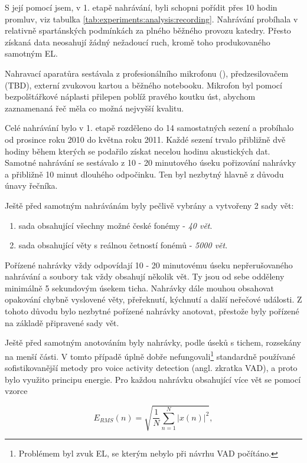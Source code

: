 S její pomocí jsem, v 1. etapě nahrávání, byli schopni pořídit přes 10 hodin promluv, viz tabulka \ref{tab:experiments:analysis:recording}. Nahrávání probíhala v relativně spartánských podmínkách za plného běžného provozu katedry. Přesto získaná data neosahují žádný nežadoucí ruch, kromě toho produkovaného samotným EL.

Nahravací aparatůra sestávala z profesionálního mikrofonu (), předzesilovačem (TBD), externí zvukovou kartou a běžného notebooku. Mikrofon byl pomocí bezpolštářkové náplasti přilepen poblíž pravého koutku úst, abychom zaznamenaná řeč měla co možná nejvyšší kvalitu.

Celé nahrávání bylo v 1. etapě rozděleno do 14 samostatných sezení a probíhalo od prosince roku 2010 do května roku 2011. Každé sezení trvalo přibližně dvě hodiny během kterých se podařilo získat necelou hodinu akustických dat. Samotné nahrávání se sestávalo z 10 - 20 minutového úseku pořizování nahrávky a přibližně 10 minut dlouhého odpočinku. Ten byl nezbytný hlavně z důvodu únavy řečníka.

Ještě před samotným nahrávánám byly pečlivě vybrány a vytvořeny 2 sady vět:

\begin{enumerate}
  \item sada obsahující všechny možné české fonémy - \textit{40 vět}.
  \item sada obsahující věty s reálnou četností fonémů - \textit{5000 vět}.
\end{enumerate}

\noindent Pořízené nahrávky vždy odpovídají 10 - 20 minutovému úseku nepřerušovaného nahrávání a soubory tak vždy obsahují několik vět. Ty jsou od sebe odděleny minimálně 5 sekundovým úsekem ticha. Nahrávky dále mouhou obsahovat opakování chybně vyslovené věty, přeřeknutí, kýchnutí a další neřečové události. Z tohoto důvodu bylo nezbytné pořízené nahrávky anotovat, přestože byly pořízené na základě připravené sady vět.

Ještě před samotným anotováním byly nahrávky, podle úseků s tichem, rozsekány na menší části. V tomto případě úplně dobře nefungovali\footnote{Problémem byl zvuk EL, se kterým nebylo při návrhu VAD počítáno.} standardně používané sofistikovanější metody pro voice activity detection (angl. zkratka VAD), a proto bylo využito principu energie. Pro každou nahrávku obsahující více vět se pomocí vzorce

\begin{equation}
  \label{eq:experiments:analysis:energy}
  E_{RMS}(n) = \sqrt{\frac{1}{N} \sum_{n=1}^{N} \left| x(n) \right|^2},
\end{equation}

